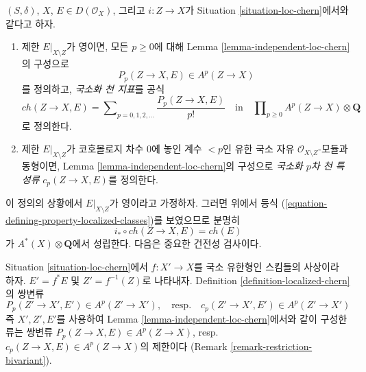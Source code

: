 \begin{definition}
\label{definition-localized-chern}
$(S, \delta)$, $X$, $E \in D(\mathcal{O}_X)$, 그리고 $i : Z \to X$가
Situation \ref{situation-loc-chern}에서와 같다고 하자.
\begin{enumerate}
\item 제한 $E|_{X \setminus Z}$가 영이면, 모든 $p \geq 0$에 대해
Lemma \ref{lemma-independent-loc-chern}의 구성으로
$$
P_p(Z \to X, E) \in A^p(Z \to X)
$$
를 정의하고, {\it 국소화 천 지표}를 공식
$$
ch(Z \to X, E) =
\sum\nolimits_{p = 0, 1, 2, \ldots} \frac{P_p(Z \to X, E)}{p!}
\quad\text{in}\quad \prod\nolimits_{p \geq 0} A^p(Z \to X) \otimes \mathbf{Q}
$$
로 정의한다.
\item 제한 $E|_{X \setminus Z}$가 코호몰로지 차수 $0$에 놓인 계수
$< p$인 유한 국소 자유 $\mathcal{O}_{X \setminus Z}$-모듈과 동형이면,
Lemma \ref{lemma-independent-loc-chern}의 구성으로
{\it 국소화 $p$차 천 특성류} $c_p(Z \to X, E)$를 정의한다.
\end{enumerate}
\end{definition}

\noindent
이 정의의 상황에서 $E|_{X \setminus Z}$가 영이라고 가정하자. 그러면
위에서 등식 (\ref{equation-defining-property-localized-classes})를
보였으므로 분명히
$$
i_* \circ ch(Z \to X, E) = ch(E)
$$
가 $A^*(X) \otimes \mathbf{Q}$에서 성립한다.
\medskip\noindent
다음은 중요한 건전성 검사이다.

\begin{lemma}
\label{lemma-base-change-loc-chern}
Situation \ref{situation-loc-chern}에서 $f : X' \to X$를 국소 유한형인
스킴들의 사상이라 하자. $E' = f^*E$ 및 $Z' = f^{-1}(Z)$로 나타내자.
Definition \ref{definition-localized-chern}의 쌍변류
$$
P_p(Z' \to X', E') \in A^p(Z' \to X'),
\quad\text{resp.}\quad
c_p(Z' \to X', E') \in A^p(Z' \to X')
$$
즉 $X', Z', E'$를 사용하여 Lemma \ref{lemma-independent-loc-chern}에서와
같이 구성한 류는 쌍변류 $P_p(Z \to X, E) \in A^p(Z \to X)$,
resp.\ $c_p(Z \to X, E) \in A^p(Z \to X)$의 제한이다
(Remark \ref{remark-restriction-bivariant}).
\end{lemma}

